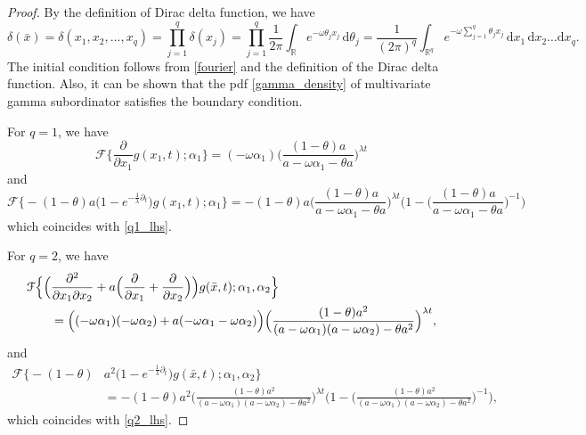 \documentclass[12pt,oneside,reqno]{amsart}
\numberwithin{equation}{section}
\theoremstyle{definition}
\numberwithin{equation}{section}
\theoremstyle{remarkstyle}
\begin{document}
\begin{proof}
By the definition of Dirac delta function, we have
{\footnotesize\begin{equation*}
\delta(\bar{x})=\delta (x_1,x_2,\dots,x_q)=\prod_{j=1}^{q}\delta (x_j)=\prod_{j=1}^{q}\frac{1}{2\pi}\int_{\mathbb{R}}e^{-\omega\theta_jx_j}\,\mathrm{d}\theta_j
=\frac{1}{(2\pi)^q}\int_{\mathbb{R}^q}e^{-\omega\sum_{j=1}^{q}\theta_j x_j}\,\mathrm{d}x_1\,\mathrm{d}x_2\dots\mathrm{d}x_q.
\end{equation*}}
The initial condition follows from \eqref{fourier} and the definition of the Dirac delta function.
Also, it can be shown that the pdf  \eqref{gamma_density} of multivariate gamma subordinator satisfies the boundary condition.
	
For $q=1$, we have
{\footnotesize	\begin{equation}\label{q1_lhs}
		\mathcal{F}\Big\{\frac{\partial}{\partial x_1}g(x_1,t);\alpha_1\Big\}=(-\omega\alpha_1)\Big(\frac{(1-\theta)a}{a-\omega\alpha_1-\theta a}\Big)^{\lambda t}
	\end{equation}}
and
{\footnotesize \begin{equation*}
		\mathcal{F}\Big\{-(1-\theta)a\Big(1-e^{-\frac{1}{\lambda}\partial_t}\Big)g(x_1,t);\alpha_1\Big\}=-(1-\theta)a\Big(\frac{(1-\theta)a}{a-\omega\alpha_1-\theta a}\Big)^{\lambda t}\Big(1-\Big(\frac{(1-\theta)a}{a-\omega\alpha_1-\theta a}\Big)^{-1}\Big)
	\end{equation*}}
	which coincides with \eqref{q1_lhs}.

For $q=2$, we have
{	\begin{align}\label{q2_lhs}
		\mathcal{F}\Bigl\{\Big(&\frac{\partial^2}{\partial x_1\partial x_2}+a\Big(\frac{\partial}{\partial x_1}+\frac{\partial}{\partial x_2}\Big)\Big)g(\bar{x},t);\alpha_1,\alpha_2\Bigr\}\nonumber\\
		&=\Big((-\omega\alpha_1)(-\omega\alpha_2)+a(-\omega\alpha_1-\omega\alpha_2)\Big)\Big(\frac{(1-\theta)a^2}{(a-\omega\alpha_1)(a-\omega\alpha_2)-\theta a^2}\Big)^{\lambda t},
	\end{align}}
	and
{\footnotesize	\begin{align*}
		\mathcal{F}\Big\{-(1-\theta)&a^2\Big(1-e^{-\frac{1}{\lambda}\partial_t}\Big)g(\bar{x},t);\alpha_1,\alpha_2\Big\}\\
		&=-(1-\theta)a^2 \Big(\frac{(1-\theta)a^2}{(a-\omega\alpha_1)(a-\omega\alpha_2)-\theta a^2}\Big)^{\lambda t}\Big(1-\Big(\frac{(1-\theta)a^2}{(a-\omega\alpha_1)(a-\omega\alpha_2)-\theta a^2}\Big)^{-1}\Big),
	\end{align*}}
	which coincides with \eqref{q2_lhs}.
	

\end{proof}
\end{document}

